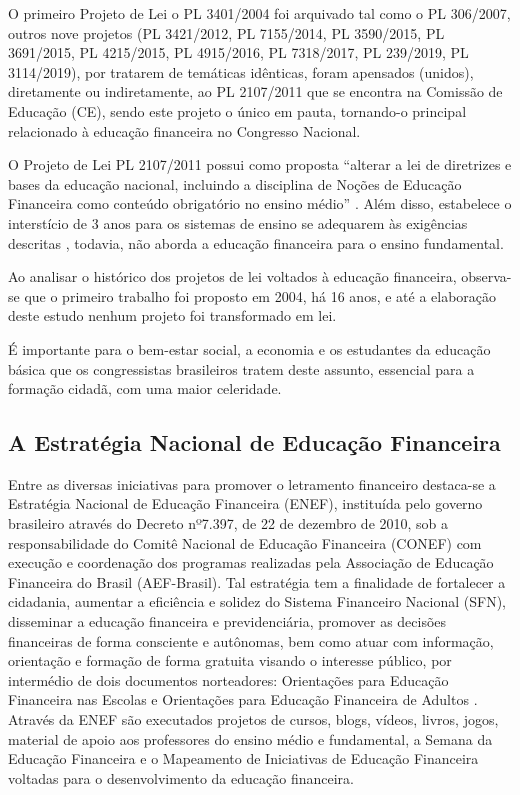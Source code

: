 O primeiro Projeto de Lei o PL 3401/2004 foi arquivado tal como o PL 306/2007, outros nove projetos (PL 3421/2012, PL 7155/2014, PL 3590/2015, PL 3691/2015, PL 4215/2015, PL 4915/2016, PL 7318/2017, PL 239/2019, PL 3114/2019), por tratarem de temáticas idênticas, foram apensados (unidos), diretamente ou indiretamente, ao PL 2107/2011 que se encontra na Comissão de Educação (CE), sendo este projeto o único em pauta, tornando-o principal relacionado à educação financeira no Congresso Nacional.

O Projeto de Lei PL 2107/2011 possui como proposta “alterar a lei de diretrizes e bases da educação nacional, incluindo a disciplina de Noções de Educação Financeira como conteúdo obrigatório no ensino médio” \cite{brasil2011}. Além disso, estabelece o interstício de 3 anos para os sistemas de ensino se adequarem às exigências descritas \cite{brasil2011}, todavia, não aborda a educação financeira para o ensino fundamental.

Ao analisar o histórico dos projetos de lei voltados à educação financeira, observa-se que o primeiro trabalho foi proposto em 2004, há 16 anos, e até a elaboração deste estudo nenhum projeto foi transformado em lei.

É importante para o bem-estar social, a economia e os estudantes da educação básica que os congressistas brasileiros tratem deste assunto, essencial para a formação cidadã, com uma maior celeridade.


\subsection{A Estratégia Nacional de Educação Financeira}
Entre as diversas iniciativas para promover o letramento financeiro destaca-se a Estratégia Nacional de Educação Financeira (ENEF), instituída pelo governo brasileiro através do Decreto nº7.397, de 22 de dezembro de 2010, sob a responsabilidade do Comitê Nacional de Educação Financeira (CONEF) com execução e coordenação dos programas realizadas pela Associação de Educação Financeira do Brasil (AEF-Brasil). Tal estratégia tem a finalidade de fortalecer a cidadania, aumentar a eficiência e solidez do Sistema Financeiro Nacional (SFN), disseminar a educação financeira e previdenciária, promover as decisões financeiras de forma consciente e autônomas, bem como atuar com informação, orientação e formação de forma gratuita visando o interesse público, por intermédio de dois documentos norteadores: Orientações para Educação Financeira nas Escolas e Orientações para Educação Financeira de Adultos \cite{enef2010}. Através da ENEF são executados projetos de cursos, blogs, vídeos, livros, jogos, material de apoio aos professores do ensino médio e fundamental, a Semana da Educação Financeira e o Mapeamento de Iniciativas de Educação Financeira voltadas para o desenvolvimento da educação financeira.

